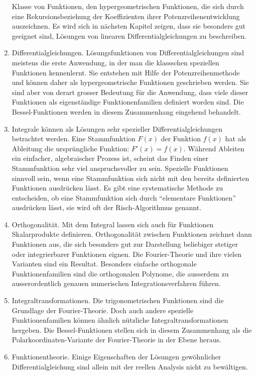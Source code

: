 \begin{enumerate}
Klasse von Funktionen, den hypergeometrischen Funktionen, die sich
durch eine Rekursionsbeziehung der Koeffizienten ihrer
Potenzreihenentwicklung auszeichnen.
Es wird sich in nächsten Kapitel zeigen, dass sie besonders gut
geeignet sind, Lösungen von linearen Differentialgleichungen zu
beschreiben.
\item
Differentialgleichungen.
Lösungsfunktionen von Differentialgleichungen sind meistens die
erste Anwendung, in der man die klassschen speziellen Funktionen
kennenlernt.
Sie entstehen mit Hilfe der Potenzreihenmethode und können daher
als hypergeometrische Funktionen geschrieben werden.
Sie sind aber von derart grosser Bedeutung für die Anwendung,
dass viele dieser Funktionen als eigenständige Funktionenfamilien
definiert worden sind.
Die Bessel-Funktionen werden in diesem Zusammenhang eingehend
behandelt.
\item
Integrale können als Lösungen sehr spezieller Differentialgleichungen
betrachtet werden.
Eine Stammfunktion $F(x)$ der Funktion $f(x)$ hat als Ableitung die
ursprüngliche Funktion: $F'(x)=f(x)$.
Während Ableiten ein einfacher, algebraischer Prozess ist, 
scheint das Finden einer Stammfunktion sehr viel anspruchsvoller
zu sein.
Spezielle Funktionen sinnvoll sein, wenn eine Stammfunktion sich nicht
mit den bereits definierten Funktionen ausdrücken lässt.
Es gibt eine systematische Methode zu entscheiden, ob eine Stammfunktion
sich durch ``elementare Funktionen'' ausdrücken lässt, sie wird oft
der Risch-Algorithmus genannt.
\item
Orthogonalität.
Mit dem Integral lassen sich auch für Funktionen Skalarprodukte
definieren.
Orthogonalität zwischen Funktionen zeichnet dann Funktionen aus, die
sich besonders gut zur Darstellung beliebiger stetiger oder
integrierbarer Funktionen eignen.
Die Fourier-Theorie und ihre vielen Varianten sind ein Resultat.
Besonders einfache orthogonale Funktionenfamilien sind die orthogonalen
Polynome, die ausserdem zu ausserordentlich genauen numerischen
Integrationsverfahren führen.
\item
Integraltransformationen.
Die trigonometrischen Funktionen sind die Grundlage der Fourier-Theorie.
Doch auch andere spezielle Funktionenfamilien können ähnlich
nützliche Integraltransformationen hergeben.
Die Bessel-Funktionen stellen sich in diesem Zusammenhang als die
Polarkoordinaten-Variante der Fourier-Theorie in der Ebene heraus.
\item
Funktionentheorie.
Einige Eigenschaften der Lösungen gewöhnlicher Differentialgleichung
sind allein mit der reellen Analysis nicht zu bewältigen.

\end{enumerate}
